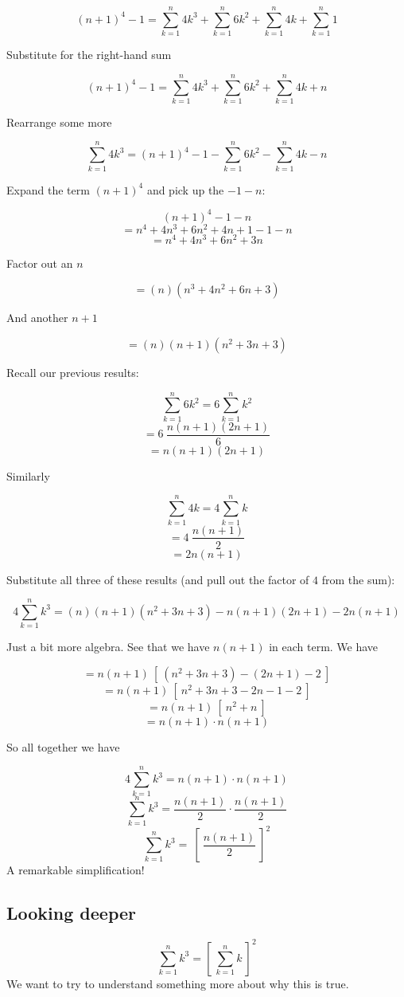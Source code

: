 \documentclass[11pt, oneside]{article}
\begin{document}
\[ (n+1)^4 - 1 = \sum_{k=1}^n 4k^3 + \sum_{k=1}^n 6k^2 + \sum_{k=1}^n 4k + \sum_{k=1}^n 1 \]

Substitute for the right-hand sum

\[ (n+1)^4 - 1 = \sum_{k=1}^n 4k^3 + \sum_{k=1}^n 6k^2 + \sum_{k=1}^n 4k + n \]

Rearrange some more

\[ \sum_{k=1}^n 4k^3 = (n+1)^4 - 1 - \sum_{k=1}^n 6k^2 - \sum_{k=1}^n 4k - n \]

Expand the term $(n+1)^4$ and pick up the $-1 - n$:

\[ (n+1)^4 - 1 - n \]
\[ = n^4 + 4n^3 + 6n^2 + 4n + 1 - 1 - n \]
\[ =  n^4 + 4n^3 + 6n^2 + 3n  \]

Factor out an $n$

\[ = (n)(n^3 + 4n^2 + 6n + 3) \]

And another $n+1$

\[ = (n)(n+1)(n^2 + 3n + 3) \]

Recall our previous results:

\[ \sum_{k=1}^n 6k^2 = 6 \sum_{k=1}^n k^2 \]
\[ = 6 \ \frac{n(n+1)(2n+1)}{6}  \] 
\[ = n(n+1)(2n+1) \] 

Similarly

\[ \sum_{k=1}^n 4k = 4 \sum_{k=1}^n k \]
\[ = 4 \ \frac{n(n+1)}{2} \]
\[ = 2 n(n+1) \]

Substitute all three of these results (and pull out the factor of $4$ from the sum):

\[ 4\sum_{k=1}^n k^3 = (n)(n+1)(n^2 + 3n + 3) - n(n+1)(2n+1) -  2 n(n+1) \] 

Just a bit more algebra.  See that we have $n(n+1)$ in each term.  We have

\[ = n(n+1) \ [ \ (n^2 + 3n + 3) - (2n+1) -  2 \ ]  \]
\[ = n(n+1) \ [ \ n^2 + 3n + 3 - 2n - 1 -  2 \ ]  \]
\[ = n(n+1) \ [ \ n^2 + n  \ ]  \]
\[ = n(n+1)  \cdot  n(n+1)  \]

So all together we have

\[ 4\sum_{k=1}^n k^3 = n(n+1) \cdot n (n+1) \] 
\[ \sum_{k=1}^n k^3 = \frac{n(n+1)}{2} \cdot \frac{n (n+1)}{2} \] 
\[ \sum_{k=1}^n k^3 = \ [ \ \frac{n(n+1)}{2} \ ]^2 \] 
A remarkable simplification! 

\subsection*{Looking deeper}

\[ \sum\limits_{k=1}^n k^3 = [\ \sum\limits_{k=1}^n k \ ] ^2 \]
We want to try to understand something more about why this is true.  
\end{document}
